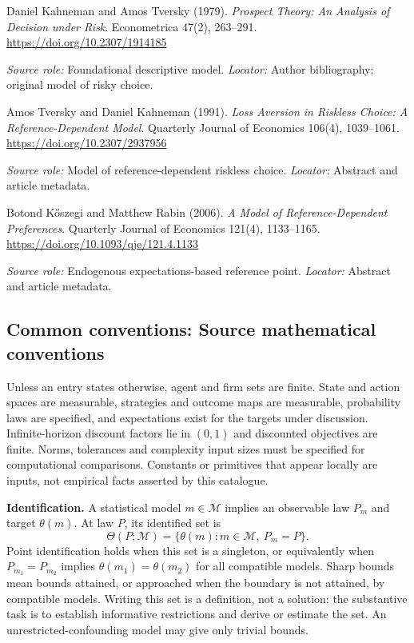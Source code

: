 \documentclass[11pt,a4paper]{article}
\begin{document}
\begin{enumerate}[label={[S\arabic*]},leftmargin=*]

\item Daniel Kahneman and Amos Tversky (1979). \emph{Prospect Theory: An Analysis of Decision under Risk}. Econometrica 47(2), 263--291. \url{https://doi.org/10.2307/1914185}\par \textit{Source role:} Foundational descriptive model. \textit{Locator:} Author bibliography; original model of risky choice.

\item Amos Tversky and Daniel Kahneman (1991). \emph{Loss Aversion in Riskless Choice: A Reference-Dependent Model}. Quarterly Journal of Economics 106(4), 1039--1061. \url{https://doi.org/10.2307/2937956}\par \textit{Source role:} Model of reference-dependent riskless choice. \textit{Locator:} Abstract and article metadata.

\item Botond Kőszegi and Matthew Rabin (2006). \emph{A Model of Reference-Dependent Preferences}. Quarterly Journal of Economics 121(4), 1133--1165. \url{https://doi.org/10.1093/qje/121.4.1133}\par \textit{Source role:} Endogenous expectations-based reference point. \textit{Locator:} Abstract and article metadata.

\end{enumerate}

\subsection*{Common conventions: Source mathematical conventions}

Unless an entry states otherwise, agent and firm sets are finite. State and action spaces are measurable, strategies and outcome maps are measurable, probability laws are specified, and expectations exist for the targets under discussion. Infinite-horizon discount factors lie in $(0,1)$ and discounted objectives are finite. Norms, tolerances and complexity input sizes must be specified for computational comparisons. Constants or primitives that appear locally are inputs, not empirical facts asserted by this catalogue.

\textbf{Identification.} A statistical model $m\in\mathcal M$ implies an observable law $P_m$ and target $\theta(m)$. At law $P$, its identified set is
\[
\Theta(P;\mathcal M)=\{\theta(m):m\in\mathcal M,\ P_m=P\}.
\]
Point identification holds when this set is a singleton, or equivalently when $P_{m_1}=P_{m_2}$ implies $\theta(m_1)=\theta(m_2)$ for all compatible models. Sharp bounds mean bounds attained, or approached when the boundary is not attained, by compatible models. Writing this set is a definition, not a solution: the substantive task is to establish informative restrictions and derive or estimate the set. An unrestricted-confounding model may give only trivial bounds.
\end{document}
